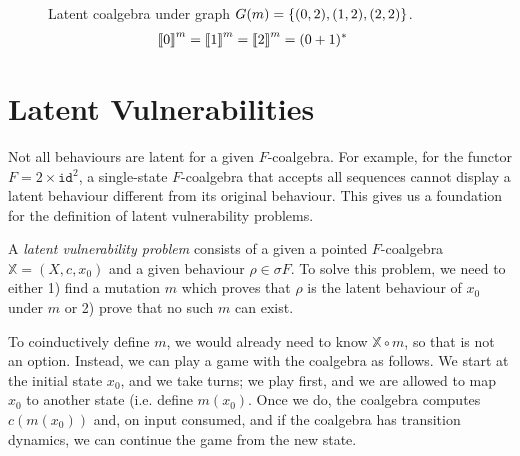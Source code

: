 \begin{example}
\begin{figure}[t]
\caption{Latent coalgebra under graph $G(m)=\left\{(0,2),(1,2),(2,2)\right\}$. 
\protect\begin{align*}
{{{\llbracket0\rrbracket}}^{m}}&={{{\llbracket1\rrbracket}}^{m}}={{{\llbracket2\rrbracket}}^{m}}=(0+1)^*
\protect\end{align*}
}
\label{fig:latent27}
\end{figure}

\end{example}

\section{Latent Vulnerabilities}
Not all behaviours are latent for a given $F$-coalgebra. For example, for the functor $F=2\times \texttt{id}^2$, a single-state $F$-coalgebra that accepts all sequences cannot display a latent behaviour different from its original behaviour. This gives us a foundation for the definition of {latent vulnerability problems}.

\begin{definition}
A \emph{latent vulnerability problem} consists of a given a pointed $F$-coalgebra $\mathbb{X}=(X,c,x_0)$ and a given behaviour $\rho\in \sigma F$. To solve this problem, we need to either 1) find a mutation $m$ which proves that $\rho$ is the latent behaviour of $x_0$ under $m$ or 2) prove that no such $m$ can exist.
\end{definition}

To coinductively define $m$, we would already need to know $\mathbb{X}\circ m$, so that is not an option. Instead, we can play a game with the coalgebra as follows. We start at the initial state $x_0$, and we take turns; we play first, and we are allowed to map $x_0$ to another state (i.e. define $m(x_0)$. Once we do, the coalgebra computes $c(m(x_0))$ and, on input consumed, and if the coalgebra has transition dynamics, we can continue the game from the new state.

